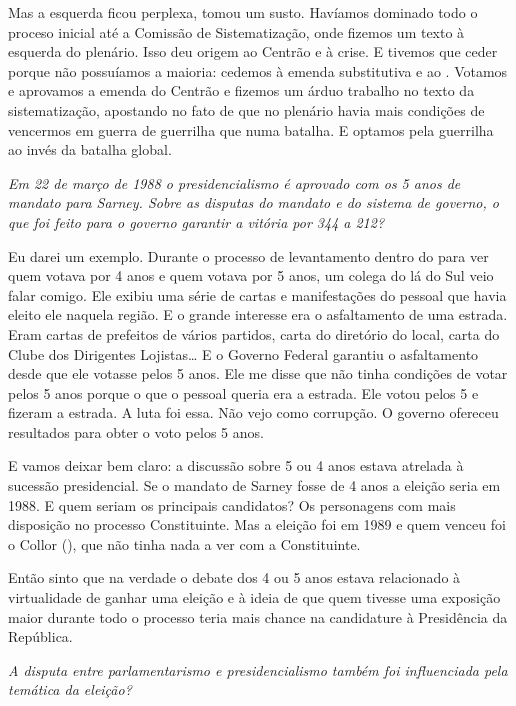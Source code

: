 Mas a esquerda ficou perplexa, tomou um susto. Havíamos dominado todo o
proceso inicial até a Comissão de Sistematização, onde fizemos um texto
à esquerda do plenário. Isso deu origem ao Centrão e à crise. E tivemos
que ceder porque não possuíamos a maioria: cedemos à emenda substitutiva
e ao . Votamos e aprovamos a emenda do Centrão e fizemos um árduo
trabalho no texto da sistematização, apostando no fato de que no
plenário havia mais condições de vencermos em guerra de guerrilha que
numa batalha. E optamos pela guerrilha ao invés da batalha global.

\medskip

\noindent\emph{Em 22 de março de 1988 o presidencialismo é aprovado com os 5 anos de
mandato para Sarney. Sobre as disputas do mandato e do sistema de
governo, o que foi feito para o governo garantir a vitória por 344 a
212?}

Eu darei um exemplo. Durante o processo de levantamento
dentro do  para ver quem votava por 4 anos e quem votava por 5 anos,
um colega do  lá do Sul veio falar comigo. Ele exibiu uma série de
cartas e manifestações do pessoal que havia eleito ele naquela região. E
o grande interesse era o asfaltamento de uma estrada. Eram cartas de
prefeitos de vários partidos, carta do diretório do  local, carta do
Clube dos Dirigentes Lojistas\ldots{} E o Governo Federal garantiu o
asfaltamento desde que ele votasse pelos 5 anos. Ele me disse que não
tinha condições de votar pelos 5 anos porque o que o pessoal queria era
a estrada. Ele votou pelos 5 e fizeram a estrada. A luta foi essa. Não
vejo como corrupção. O governo ofereceu resultados para obter o voto
pelos 5 anos.

E vamos deixar bem claro: a discussão sobre 5 ou 4 anos estava atrelada
à sucessão presidencial. Se o mandato de Sarney fosse de 4 anos a
eleição seria em 1988. E quem seriam os principais candidatos? Os
personagens com mais disposição no processo Constituinte. Mas a eleição
foi em 1989 e quem venceu foi o Collor (), que não tinha nada a ver
com a Constituinte.

Então sinto que na verdade o debate dos 4 ou 5 anos estava relacionado à
virtualidade de ganhar uma eleição e à ideia de que quem tivesse uma
exposição maior durante todo o processo teria mais chance na candidature
à Presidência da República.

\medskip

\noindent\emph{A disputa entre parlamentarismo e presidencialismo também foi
influenciada pela temática da eleição?}

